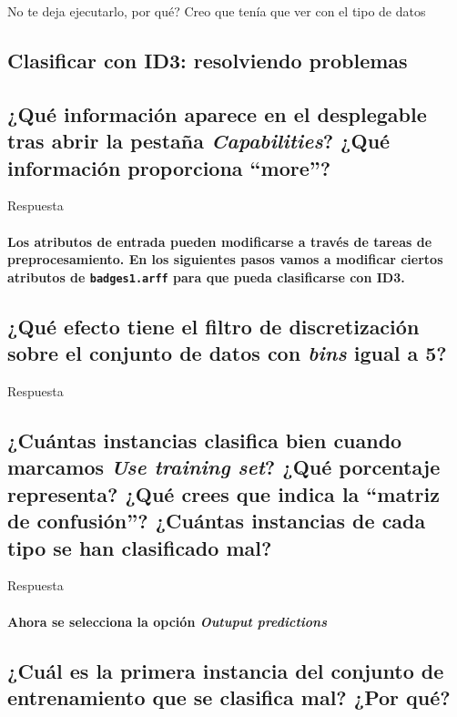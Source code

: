 \documentclass[12pt]{article}
\begin{document}
No te deja ejecutarlo, por qué? Creo que tenía que ver con el tipo de datos

\newpage

\begin{center}
\section{Clasificar con ID3: resolviendo problemas}
\end{center}

\subsection{\small ¿Qué información aparece en el desplegable tras abrir la pestaña
\emph{Capabilities}? ¿Qué información proporciona ``more''?}

Respuesta

\paragraph{\small Los atributos de entrada pueden modificarse a través de tareas de
preprocesamiento. En los siguientes pasos vamos a modificar ciertos atributos
de \texttt{badges1.arff} para que pueda clasificarse con ID3.}

\subsection{\small ¿Qué efecto tiene el filtro de discretización sobre el conjunto de
datos con \emph{bins} igual a 5?}

Respuesta

\subsection{\small ¿Cuántas instancias clasifica bien cuando marcamos \emph{Use
training set}? ¿Qué porcentaje representa? ¿Qué crees que indica la ``matriz de
confusión''? ¿Cuántas instancias de cada tipo se han clasificado mal?}

Respuesta

\paragraph{\small Ahora se selecciona la opción \emph{Outuput predictions}}
\subsection{\small ¿Cuál es la primera instancia del conjunto de entrenamiento que se
clasifica mal? ¿Por qué?}
\end{document}
